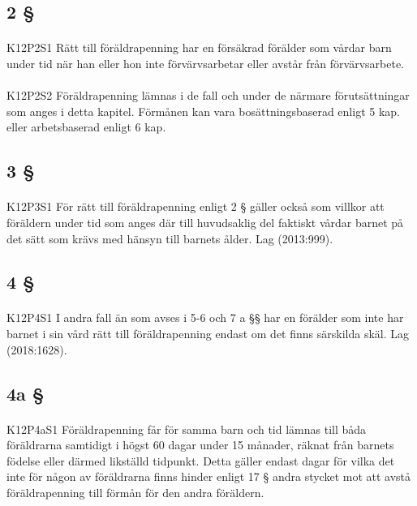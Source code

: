 \documentclass[a4paper,notitlepage,openany,10pt]{book}
\begin{document}
\subsection*{2 §}
\paragraph*{}
{\tiny K12P2S1}
Rätt till föräldrapenning har en försäkrad förälder som vårdar barn under tid när han eller hon inte förvärvsarbetar eller avstår från förvärvsarbete.
\paragraph*{}
{\tiny K12P2S2}
Föräldrapenning lämnas i de fall och under de närmare förutsättningar som anges i detta kapitel. Förmånen kan vara bosättningsbaserad enligt 5 kap. eller arbetsbaserad enligt 6 kap.
\subsection*{3 §}
\paragraph*{}
{\tiny K12P3S1}
För rätt till föräldrapenning enligt 2 § gäller också som villkor att föräldern under tid som anges där till huvudsaklig del faktiskt vårdar barnet på det sätt som krävs med hänsyn till barnets ålder.
Lag (2013:999).
\subsection*{4 §}
\paragraph*{}
{\tiny K12P4S1}
I andra fall än som avses i 5-6 och 7 a §§ har en förälder som inte har barnet i sin vård rätt till föräldrapenning endast om det finns särskilda skäl.
Lag (2018:1628).
\subsection*{4a §}
\paragraph*{}
{\tiny K12P4aS1}
Föräldrapenning får för samma barn och tid lämnas till båda föräldrarna samtidigt i högst 60 dagar under 15 månader, räknat från barnets födelse eller därmed likställd tidpunkt. Detta gäller endast dagar för vilka det inte för någon av föräldrarna finns hinder enligt 17 § andra stycket mot att avstå föräldrapenning till förmån för den andra föräldern.
\end{document}
